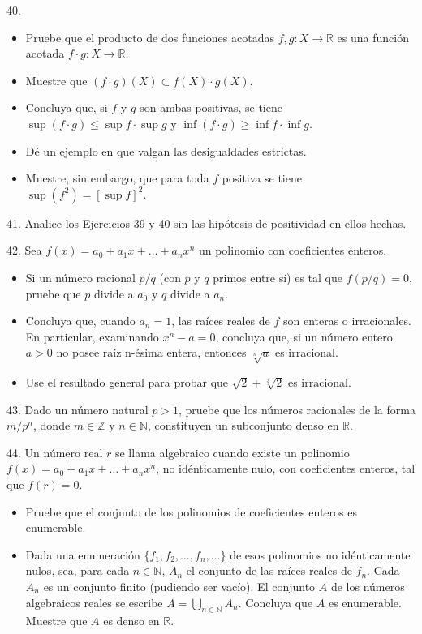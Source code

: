 \documentclass[12pt,oneside]{book}
\begin{document}
40. \begin{itemize}
    \item [i)] Pruebe que el producto de dos funciones acotadas \(f, g: X \to \mathbb{R}\) es una función acotada \(f \cdot g: X \to \mathbb{R}\).
    \item [ii)] Muestre que \((f \cdot g)(X) \subset f(X) \cdot g(X)\).
    \item [iii)] Concluya que, si \(f\) y \(g\) son ambas positivas, se tiene \(\sup(f \cdot g) \leq \sup f \cdot \sup g\) y \(\inf(f \cdot g) \geq \inf f \cdot \inf g\).
    \item [iv)] Dé un ejemplo en que valgan las desigualdades estrictas.
    \item [v)] Muestre, sin embargo, que para toda \(f\) positiva se tiene \(\sup(f^2) = [\sup f]^2\).
\end{itemize}

41. Analice los Ejercicios 39 y 40 sin las hipótesis de positividad en ellos hechas.

42. Sea \(f(x) = a_0 + a_1x + \dots + a_nx^n\) un polinomio con coeficientes enteros.

\begin{itemize}
    \item [i)] Si un número racional \(p/q\) (con \(p\) y \(q\) primos entre sí) es tal que \(f(p/q) = 0\), pruebe que \(p\) divide a \(a_0\) y \(q\) divide a \(a_n\).
    \item [ii)] Concluya que, cuando \(a_n = 1\), las raíces reales de \(f\) son enteras o irracionales. En particular, examinando \(x^n - a = 0\), concluya que, si un número entero \(a > 0\) no posee raíz n-ésima entera, entonces \(\sqrt[n]{a}\) es irracional.
    \item [iii)] Use el resultado general para probar que \(\sqrt{2} + \sqrt[3]{2}\) es irracional.
\end{itemize}

43. Dado un número natural \(p > 1\), pruebe que los números racionales de la forma \(m/p^n\), donde \(m \in \mathbb{Z}\) y \(n \in \mathbb{N}\), constituyen un subconjunto denso en \(\mathbb{R}\).

44. Un número real \(r\) se llama algebraico cuando existe un polinomio \(f(x) = a_0 + a_1x + \dots + a_nx^n\), no idénticamente nulo, con coeficientes enteros, tal que \(f(r) = 0\).

\begin{itemize}
    \item [i)] Pruebe que el conjunto de los polinomios de coeficientes enteros es enumerable.
    \item [ii)] Dada una enumeración \(\{f_1, f_2, \dots, f_n, \dots\}\) de esos polinomios no idénticamente nulos, sea, para cada \(n \in \mathbb{N}\), \(A_n\) el conjunto de las raíces reales de \(f_n\). Cada \(A_n\) es un conjunto finito (pudiendo ser vacío). El conjunto \(A\) de los números algebraicos reales se escribe \(A = \bigcup_{n\in\mathbb{N}} A_n\). Concluya que \(A\) es enumerable. Muestre que \(A\) es denso en \(\mathbb{R}\).
\end{itemize}
\end{document}
